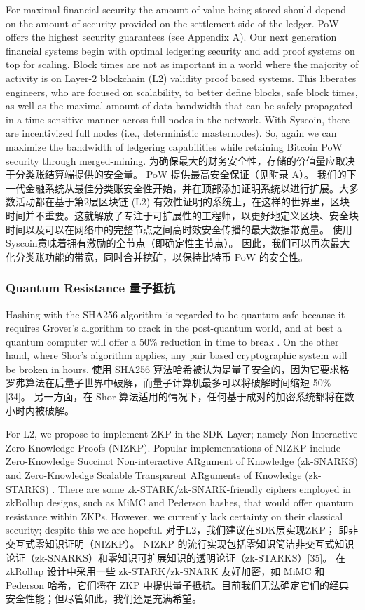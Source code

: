 \documentclass{ctexart}
\begin{document}
For maximal financial security the amount of value being stored should depend on the amount of security provided on the settlement side of the ledger. PoW offers the highest security guarantees (see Appendix A). Our next generation financial systems begin with optimal ledgering security and add proof systems on top for scaling. Block times are not as important in a world where the majority of activity is on Layer-2 blockchain (L2) validity proof based systems. This liberates engineers, who are focused on scalability, to better define blocks, safe block times, as well as the maximal amount of data bandwidth that can be safely propagated in a time-sensitive manner across full nodes in the network. With Syscoin, there are incentivized full nodes (i.e., deterministic masternodes). So, again we can maximize the bandwidth of ledgering capabilities while retaining Bitcoin PoW security through merged-mining. 为确保最大的财务安全性，存储的价值量应取决于分类账结算端提供的安全量。 PoW 提供最高安全保证（见附录 A）。 我们的下一代金融系统从最佳分类账安全性开始，并在顶部添加证明系统以进行扩展。大多数活动都在基于第2层区块链 (L2) 有效性证明的系统上，在这样的世界里，区块时间并不重要。这就解放了专注于可扩展性的工程师，以更好地定义区块、安全块时间以及可以在网络中的完整节点之间高时效安全传播的最大数据带宽量。 使用 Syscoin意味着拥有激励的全节点（即确定性主节点）。 因此，我们可以再次最大化分类账功能的带宽，同时合并挖矿，以保持比特币 PoW 的安全性。

\subsubsection{Quantum Resistance 量子抵抗}

Hashing with the SHA256 algorithm is regarded to be quantum safe because it requires Grover's algorithm to crack in the post-quantum world, and at best a quantum computer will offer a 50\% reduction in time to break \cite{Nai19}. On the other hand, where Shor’s algorithm applies, any pair based cryptographic system will be broken in hours. 使用 SHA256 算法哈希被认为是量子安全的，因为它要求格罗弗算法在后量子世界中破解，而量子计算机最多可以将破解时间缩短 50\% [34]。 另一方面，在 Shor 算法适用的情况下，任何基于成对的加密系统都将在数小时内被破解。

For L2, we propose to implement ZKP in the SDK Layer; namely Non-Interactive Zero Knowledge Proofs (NIZKP). Popular implementations of NIZKP include Zero-Knowledge Succinct Non-interactive ARgument of Knowledge (zk-SNARKS) and Zero-Knowledge Scalable Transparent ARguments of Knowledge (zk-STARKS) \cite{Nas19}. There are some zk-STARK/zk-SNARK-friendly ciphers employed in zkRollup designs, such as MiMC and Pederson hashes, that would offer quantum resistance within ZKPs. However, we currently lack certainty on their classical security; despite this we are hopeful. 对于L2，我们建议在SDK层实现ZKP； 即非交互式零知识证明（NIZKP）。 NIZKP 的流行实现包括零知识简洁非交互式知识论证（zk-SNARKS）和零知识可扩展知识的透明论证（zk-STARKS）[35]。 在 zkRollup 设计中采用一些 zk-STARK/zk-SNARK 友好加密，如 MiMC 和 Pederson 哈希，它们将在 ZKP 中提供量子抵抗。目前我们无法确定它们的经典安全性能；但尽管如此，我们还是充满希望。
\end{document}
